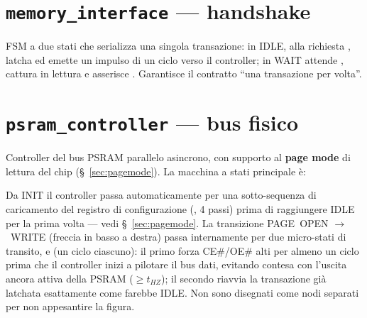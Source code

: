\section{\texttt{memory\_interface} --- handshake}
FSM a due stati che serializza una singola transazione: in IDLE, alla richiesta
, latcha  ed emette un impulso 
di un ciclo verso il controller; in WAIT attende , cattura
 in lettura e asserisce . Garantisce il contratto ``una
transazione per volta''.

\section{\texttt{psram\_controller} --- bus fisico}
Controller del bus PSRAM parallelo asincrono, con supporto al \textbf{page mode}
di lettura del chip (\S~\ref{sec:pagemode}). La macchina a stati principale è:

\begin{center}
\end{center}

Da INIT il controller passa automaticamente per una sotto-sequenza di caricamento del
registro di configurazione (, 4 passi) prima di raggiungere IDLE
per la prima volta --- vedi \S~\ref{sec:pagemode}. La transizione PAGE~OPEN
$\to$~WRITE (freccia in basso a destra) passa internamente per due micro-stati di
transito,  e  (un ciclo ciascuno):
il primo forza CE\#/OE\# alti per almeno un ciclo prima che il controller inizi a
pilotare il bus dati, evitando contesa con l'uscita ancora attiva della PSRAM
($\geq t_{HZ}$); il secondo riavvia la transazione già latchata esattamente come
farebbe IDLE. Non sono disegnati come nodi separati per non appesantire la figura.

